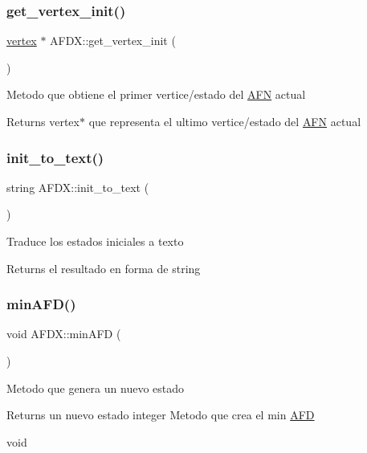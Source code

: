 \subsubsection{\texorpdfstring{get\+\_\+vertex\+\_\+init()}{get\_vertex\_init()}}
{\footnotesize\ttfamily \hyperlink{structvertex}{vertex} $\ast$ A\+F\+D\+X\+::get\+\_\+vertex\+\_\+init (\begin{DoxyParamCaption}{ }\end{DoxyParamCaption})}

Metodo que obtiene el primer vertice/estado del \hyperlink{class_a_f_n}{A\+FN} actual \begin{DoxyReturn}{Returns}
vertex$\ast$ que representa el ultimo vertice/estado del \hyperlink{class_a_f_n}{A\+FN} actual 
\end{DoxyReturn}
\hypertarget{class_a_f_d_x_a73888a711ee57d75df9069f70bc06815}{}\label{class_a_f_d_x_a73888a711ee57d75df9069f70bc06815} 
\subsubsection{\texorpdfstring{init\+\_\+to\+\_\+text()}{init\_to\_text()}}
{\footnotesize\ttfamily string A\+F\+D\+X\+::init\+\_\+to\+\_\+text (\begin{DoxyParamCaption}{ }\end{DoxyParamCaption})}

Traduce los estados iniciales a texto \begin{DoxyReturn}{Returns}
el resultado en forma de string 
\end{DoxyReturn}
\hypertarget{class_a_f_d_x_aba731125afd626a8dbdab726dbd441eb}{}\label{class_a_f_d_x_aba731125afd626a8dbdab726dbd441eb} 
\subsubsection{\texorpdfstring{min\+A\+F\+D()}{minAFD()}}
{\footnotesize\ttfamily void A\+F\+D\+X\+::min\+A\+FD (\begin{DoxyParamCaption}{ }\end{DoxyParamCaption})}

Metodo que genera un nuevo estado \begin{DoxyReturn}{Returns}
un nuevo estado integer Metodo que crea el min \hyperlink{class_a_f_d}{A\+FD} 

void 
\end{DoxyReturn}
\hypertarget{class_a_f_d_x_a312f7b6465d0a7b906449f01d23f199c}{}\label{class_a_f_d_x_a312f7b6465d0a7b906449f01d23f199c} 
